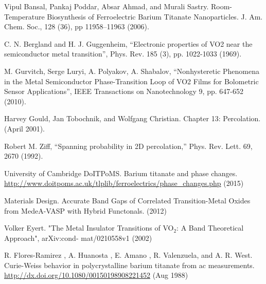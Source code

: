 \documentclass[%
 reprint,
 amsmath,amssymb,
 aps,
 pra,
]{revtex4-1}
\begin{document}
\begin{thebibliography}{6}
	Vipul Bansal, Pankaj Poddar, Absar Ahmad, and Murali Sastry. Room-Temperature Biosynthesis of Ferroelectric Barium Titanate Nanoparticles. J. Am. Chem. Soc., 128 (36), pp 11958–11963 (2006).
	
	C. N. Bergland and H. J. Guggenheim, “Electronic properties of VO2 near the semiconductor metal transition”, Phys. Rev. 185 (3), pp. 1022-1033 (1969).
	
	M. Gurvitch, Serge Luryi, A. Polyakov, A. Shabalov, “Nonhysteretic Phenomena in the Metal Semiconductor Phase-Transition Loop of VO2 Films for Bolometric Sensor Applications”, IEEE Transactions on Nanotechnology 9, pp. 647-652 (2010).
	
	Harvey Gould, Jan Tobochnik, and Wolfgang Christian. Chapter 13: Percolation. (April 2001).
	
	Robert M. Ziff, “Spanning probability in 2D percolation,” Phys. Rev. Lett. 69, 2670 (1992).
	
	University of Cambridge DoITPoMS. Barium titanate and phase changes. \url{http://www.doitpoms.ac.uk/tlplib/ferroelectrics/phase_changes.php} (2015)

	Materials Design. Accurate Band Gaps of Correlated Transition-Metal Oxides from MedeA-VASP with Hybrid Functonals. (2012)

	Volker Eyert. "The Metal Insulator Transitions of VO$_{2}$: A Band Theoretical Approach", arXiv:cond-		mat/0210558v1 (2002)
	
	R. Flores-Ramirez , A. Huanosta , E. Amano , R. Valenzuela, and A. R. West. Curie-Weiss behavior in polycrystalline barium titanate from ac measurements. \url{http://dx.doi.org/10.1080/00150198908221452} (Aug 1988)

\end{thebibliography}
\end{document}

